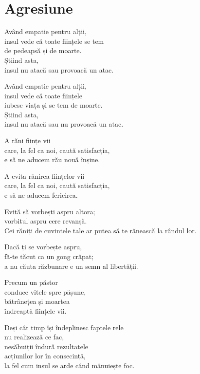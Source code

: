 
\chapter{Agresiune}


Având empatie pentru alții,\\
insul vede că toate ființele se tem\\
de pedeapsă și de moarte.\\
Știind asta,\\
insul nu atacă sau provoacă un atac.


Având empatie pentru alții,\\
insul vede că toate ființele\\
iubesc viața și se tem de moarte.\\
Știind asta,\\
insul nu atacă sau nu provoacă un atac.


A răni ființe vii\\
care, la fel ca noi, caută satisfacția,\\
e să ne aducem rău nouă înșine.


A evita rănirea ființelor vii\\
care, la fel ca noi, caută satisfacția,\\
e să ne aducem fericirea.


Evită să vorbești aspru altora;\\
vorbitul aspru cere revanșă.\\
Cei răniți de cuvintele tale ar putea să te rănească la rândul lor.


Dacă ți se vorbește aspru,\\
fă-te tăcut ca un gong crăpat;\\
a nu căuta răzbunare e un semn al libertății.


Precum un păstor\\
conduce vitele spre pășune,\\
bătrânețea și moartea\\
îndreaptă ființele vii.


Deși cât timp își îndeplinesc faptele rele\\
nu realizează ce fac,\\
nesăbuiții îndură rezultatele\\
acțiunilor lor în consecință,\\
la fel cum insul se arde când mânuiește foc.


